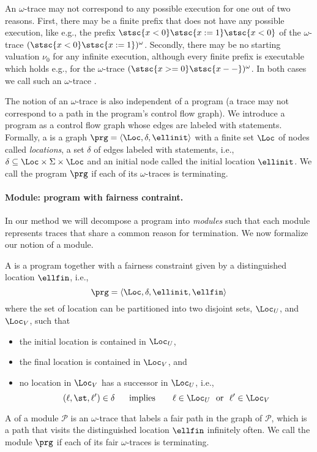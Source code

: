 An $\omega$-trace may not correspond to any possible execution
for one out of two reasons. 
First, there may be a finite prefix that does not have any possible execution, like e.g., the prefix $\stsc{x<0}\stsc{x:=1}\stsc{x<0}$ of the $\omega$-trace $(\stsc{x<0} \stsc{x:=1})^\omega$. Secondly, there may be no starting valuation $\nu_0$ for any infinite execution, although every finite prefix is executable which holds e.g., for the $\omega$-trace $(\stsc{x>=0} \stsc{x--})^\omega$. In both cases we call such an $\omega$-trace .


The notion of an $\omega$-trace is also independent of a program (a trace may
not correspond to a path in the program's control flow graph).  
We introduce a program as a control flow graph whose edges are labeled with statements. Formally, a  is a graph $\prg=\langle \Loc,\delta,\ellinit\rangle$ with a finite set $\Loc$ of nodes called \emph{locations}, a set $\delta$ of  edges labeled with statements, i.e.,
$\delta\subseteq \Loc\times\Sigma\times \Loc$ and an initial node called the initial location $\ellinit$. 
We call the program $\prg$  if each of its $\omega$-traces is terminating. 


\paragraph{Module: program with fairness contraint.}
In our method we will decompose a program into \emph{modules} such that each module represents traces that share a common reason for termination. We now formalize our notion of a module.

\begin{definition}[module]
A  is a program together with a fairness constraint
given by a distinguished
location  $\ellfin$, i.e., 
$$\prg=\langle \Loc,\delta,\ellinit,\ellfin\rangle$$
where the set of location can be partitioned into two disjoint sets, $\Loc_U$, and $\Loc_V$, such that
\begin{itemize}
\item the initial location is contained in $\Loc_U$, 
\item the final location is contained in $\Loc_V$, and
\item no location in $\Loc_V$ has a successor in $\Loc_U$, i.e.,
$$(\ell,\st,\ell')\in \delta \quad\text{\ \ implies \ \ }\quad \ell\in \Loc_U \text{ \  or \  } \ell'\in \Loc_V$$
\end{itemize}
A  of a module $\mathcal{P}$ is an
$\omega$-trace that labels a fair path in the graph of
$\mathcal{P}$, which is a path that visits the distinguished location
$\ellfin$ infinitely often.
We call the module $\prg$  if each of its fair $\omega$-traces is terminating. 
\end{definition}

